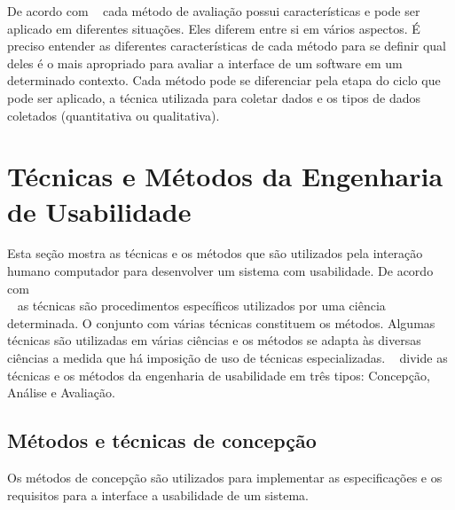 De acordo com ~ cada método de avaliação possui características e pode ser aplicado em diferentes situações.
%
Eles diferem entre si em vários aspectos. É preciso entender as diferentes características de cada método para se definir qual deles é o mais apropriado para avaliar a interface de um software em um determinado contexto.
%
Cada método pode se diferenciar pela etapa do ciclo que pode ser aplicado, a técnica utilizada para coletar dados e os tipos de dados coletados (quantitativa ou qualitativa). 


\section{Técnicas e Métodos da Engenharia de Usabilidade}

Esta seção mostra as técnicas e os métodos que são utilizados pela interação humano computador para desenvolver um sistema com usabilidade.
%
De acordo com \\ ~ as técnicas são procedimentos específicos utilizados por uma ciência determinada. O conjunto com várias técnicas constituem os métodos. Algumas técnicas são utilizadas em várias ciências e os métodos se adapta às diversas ciências a medida que há imposição de uso de técnicas especializadas.
%
~ divide as técnicas e os métodos da engenharia de usabilidade em três tipos: Concepção, Análise e Avaliação.


\subsection{Métodos e técnicas de concepção}

	Os métodos de concepção são utilizados para implementar as especificações e os requisitos para a interface a usabilidade de um sistema.


